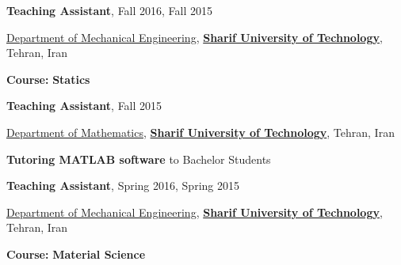 \documentclass[8pt]{article}
\newcommand{\halfblankline}{\quad\vspace{-0.5\baselineskip}\pagebreak[3]}
\begin{document}
\begin{comment}
\textbf{Teaching Assistant}, {October 2020}
\begin{innerlist}
	\item[] \href{https://www.mech.kuleuven.be/en}{Department of Mechanical engineering}, \href{https://www.kuleuven.be/english/kuleuven}{\textbf{KU Leuven}}, Leuven, Belgium
	\begin{innerlist}
		\item[] \textbf{Course:} \href{https://onderwijsaanbod.kuleuven.be//syllabi/e/H06X2AE.htm#activetab=doelstellingen_idp596880} {\textbf{Advanced Study Topics in Musculoskeletal Biomechanics}}
		
	\end{innerlist}
\end{innerlist}

\halfblankline
\end{comment}

\textbf{Teaching Assistant}, {Fall 2016, Fall 2015}
\begin{innerlist}
	\item[] \href{http://library.sharif.ir/web/mech/20}{Department of Mechanical Engineering}, \href{https://en.sharif.edu/}{\textbf{Sharif University of Technology}}, Tehran, Iran
	\begin{innerlist}
		\item[] \textbf{Course:}  {\textbf{Statics}}
		
	\end{innerlist}
\end{innerlist}

\halfblankline

\textbf{Teaching Assistant}, {Fall 2015}
\begin{innerlist}
	\item[] \href{http://math.sharif.ir/}{Department of Mathematics}, \href{https://en.sharif.edu/}{\textbf{Sharif University of Technology}}, Tehran, Iran
	\begin{innerlist}
		\item[] \textbf{Tutoring MATLAB software} to Bachelor Students
		
	\end{innerlist}
\end{innerlist}

\halfblankline

\textbf{Teaching Assistant}, {Spring 2016, Spring 2015}
\begin{innerlist}
	\item[] \href{http://library.sharif.ir/web/mech/20}{Department of Mechanical Engineering}, \href{https://en.sharif.edu/}{\textbf{Sharif University of Technology}}, Tehran, Iran
	\begin{innerlist}
		\item[] \textbf{Course:}  {\textbf{Material Science}}
		
	\end{innerlist}
\end{innerlist}
\end{document}
